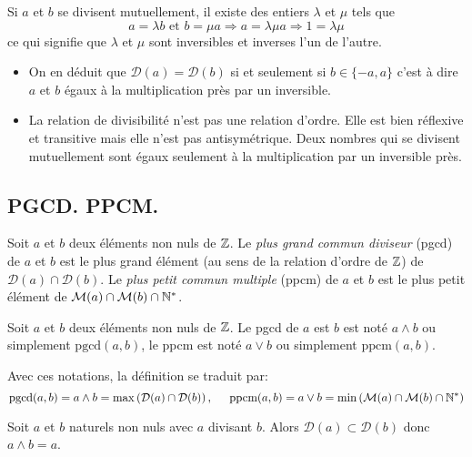\begin{demo}
Si $a$ et $b$ se divisent mutuellement, il existe des entiers $\lambda$ et $\mu$ tels que 
\begin{displaymath}
  a = \lambda b \text{ et } b = \mu a \Rightarrow a= \lambda \mu a \Rightarrow 1 = \lambda \mu
\end{displaymath}
ce qui signifie que $\lambda$ et $\mu$ sont inversibles et inverses l'un de l'autre.
\end{demo}
\begin{rems}
\begin{itemize}
  \item On en déduit que $\mathcal{D}(a)=\mathcal{D}(b)$ si et seulement si $b\in\{-a,a\}$ c'est à dire $a$ et $b$ égaux à la multiplication près par un inversible.
  \item La relation de divisibilité n'est pas une relation d'ordre. Elle est bien réflexive et transitive mais elle n'est pas antisymétrique. Deux nombres qui se divisent mutuellement sont égaux seulement à la multiplication par un inversible près.
\end{itemize}
\end{rems}

\subsection{PGCD. PPCM.}
\begin{defi}
 Soit $a$ et $b$ deux éléments non nuls de $\mathbb{Z}$.\newline
Le \emph{plus grand commun diviseur} (pgcd) de $a$ et $b$ est le plus grand élément (au sens de la relation d'ordre de $\mathbb{Z}$) de $\mathcal D(a)\cap \mathcal D(b)$.\newline
Le \emph{plus petit commun multiple} (ppcm) de $a$ et $b$ est le plus petit élément de $\mathcal M(a)\cap \mathcal M(b) \cap \mathbb{N}^*$.
\end{defi}
\begin{nota}
 Soit $a$ et $b$ deux éléments non nuls de $\mathbb{Z}$. Le pgcd de $a$ est $b$ est noté $a\wedge b$ ou simplement $\text{pgcd}(a,b)$, le ppcm est noté $a\vee b$ ou simplement $\text{ppcm}(a,b)$. 
\end{nota}
Avec ces notations, la définition se traduit par:
 \begin{displaymath}
   \text{pgcd}(a,b) = a\wedge b = \max \left( \mathcal{D}(a)\cap \mathcal{D}(b)\right) ,\hspace{0.5cm}
   \text{ppcm}(a,b) = a\vee b = \min \left( \mathcal{M}(a)\cap \mathcal{M}(b) \cap \mathbb{N}^*\right) 
 \end{displaymath}
\begin{rem}
  Soit $a$ et $b$ naturels non nuls avec $a$ divisant $b$. Alors $\mathcal{D}(a) \subset \mathcal{D}(b)$ donc $a \wedge b = a$.
\end{rem}

